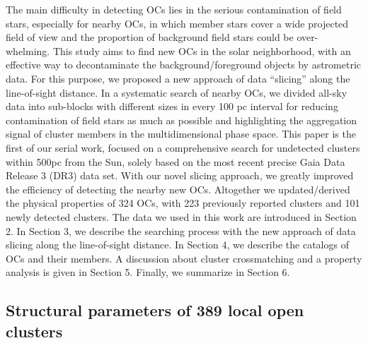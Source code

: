\documentclass[../Main.tex]{subfiles}
\begin{document}
The main difficulty in detecting OCs lies in the serious contamination of field stars, especially for nearby OCs, in which member stars cover a wide projected field of view and the proportion of background field stars could be over- whelming. This study aims to find new OCs in the solar neighborhood, with an effective way to decontaminate the background/foreground objects by astrometric data. For this purpose, we proposed a new approach of data “slicing” along the line-of-sight distance. In a systematic search of nearby OCs, we divided all-sky data into sub-blocks with different sizes in every 100 pc interval for reducing contamination of field stars as much as possible and highlighting the aggregation signal of cluster members in the multidimensional phase space.
This paper is the first of our serial work, focused on a comprehensive search for undetected clusters within 500pc from the Sun, solely based on the most recent precise Gaia Data Release 3 (DR3) data set. With our novel slicing approach, we greatly improved the efficiency of detecting the nearby new OCs. Altogether we updated/derived the physical properties of 324 OCs, with 223 previously reported clusters and 101 newly detected clusters. The data we used in this work are introduced in Section 2. In Section 3, we describe the searching process with the new approach of data slicing along the line-of-sight distance. In Section 4, we describe the catalogs of OCs and their members. A discussion about cluster crossmatching and a property analysis is given in Section 5. Finally, we summarize in Section 6.
\subsection{Structural parameters of 389 local open clusters} %
\end{document}
